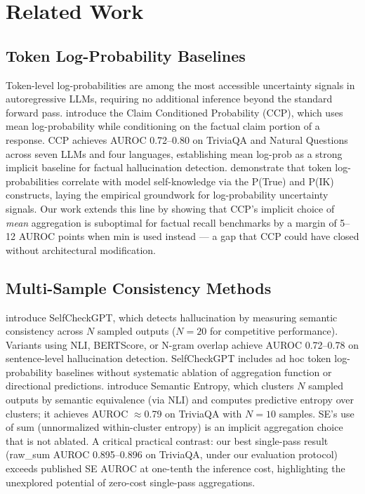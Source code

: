 \section{Related Work}

\subsection{Token Log-Probability Baselines}

Token-level log-probabilities are among the most accessible uncertainty signals in autoregressive LLMs, requiring no additional inference beyond the standard forward pass. \citet{fadeeva2024} introduce the Claim Conditioned Probability (CCP), which uses mean log-probability while conditioning on the factual claim portion of a response. CCP achieves AUROC 0.72--0.80 on TriviaQA and Natural Questions across seven LLMs and four languages, establishing mean log-prob as a strong implicit baseline for factual hallucination detection. \citet{kadavath2022} demonstrate that token log-probabilities correlate with model self-knowledge via the P(True) and P(IK) constructs, laying the empirical groundwork for log-probability uncertainty signals. Our work extends this line by showing that CCP's implicit choice of \emph{mean} aggregation is suboptimal for factual recall benchmarks by a margin of 5--12 AUROC points when min is used instead --- a gap that CCP could have closed without architectural modification.

\subsection{Multi-Sample Consistency Methods}

\citet{manakul2023} introduce SelfCheckGPT, which detects hallucination by measuring semantic consistency across $N$ sampled outputs ($N{=}20$ for competitive performance). Variants using NLI, BERTScore, or N-gram overlap achieve AUROC 0.72--0.78 on sentence-level hallucination detection. SelfCheckGPT includes ad hoc token log-probability baselines without systematic ablation of aggregation function or directional predictions. \citet{farquhar2024} introduce Semantic Entropy, which clusters $N$ sampled outputs by semantic equivalence (via NLI) and computes predictive entropy over clusters; it achieves AUROC $\approx$0.79 on TriviaQA with $N{=}10$ samples. SE's use of sum (unnormalized within-cluster entropy) is an implicit aggregation choice that is not ablated. A critical practical contrast: our best single-pass result (raw\_sum AUROC 0.895--0.896 on TriviaQA, under our evaluation protocol) exceeds published SE AUROC at one-tenth the inference cost, highlighting the unexplored potential of zero-cost single-pass aggregations.

